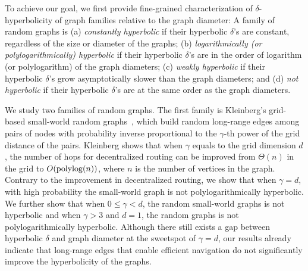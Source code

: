 \documentclass[11pt]{article}
\begin{document}

To achieve our goal, we first provide fine-grained characterization of
	$\delta$-hyperbolicity of graph families relative to the graph diameter:
A family of random graphs is 
	(a) {\em constantly hyperbolic} if their hyperbolic $\delta$'s
	are constant, regardless of the size or diameter of the graphs; 
	(b) {\em logarithmically (or polylogarithmically) hyperbolic} if their hyperbolic $\delta$'s
	are in the order of logarithm (or polylogarithm) of the graph diameters;
	(c) {\em weakly hyperbolic} if their hyperbolic $\delta$'s grow 
	asymptotically slower than the graph diameters; and
	(d) {\em not hyperbolic} if their hyperbolic $\delta$'s are at
	the same order as the graph diameters.

We study two families of random graphs.
The first family is Kleinberg's grid-based small-world random 
	graphs~\cite{Kle00}, which build random long-range edges among pairs
	of nodes
	with probability inverse proportional to the $\gamma$-th power of the
	grid distance of the pairs.
Kleinberg shows that when $\gamma$ equals to the grid dimension $d$,
the number of hops for
	decentralized routing can be improved from $\Theta(n)$ in the grid to
	$O({\rm polylog}(n))$, where $n$ is the number of vertices in the graph.
Contrary to the improvement in decentralized routing, we show that
	when $\gamma=d$, with high probability
	the small-world graph is not polylogarithmically 
	hyperbolic.
We further show that when $0\le \gamma < d$, the random small-world graphs
	is not hyperbolic and when $\gamma > 3$ and $d=1$, the random graphs
	is not polylogarithmically hyperbolic.
Although there still exists a gap between hyperbolic $\delta$ and graph diameter 
at the sweetspot of $\gamma=d$, our 
results already indicate that long-range edges that enable efficient 
navigation do not significantly improve the hyperbolicity of the graphs. 
\end{document}
